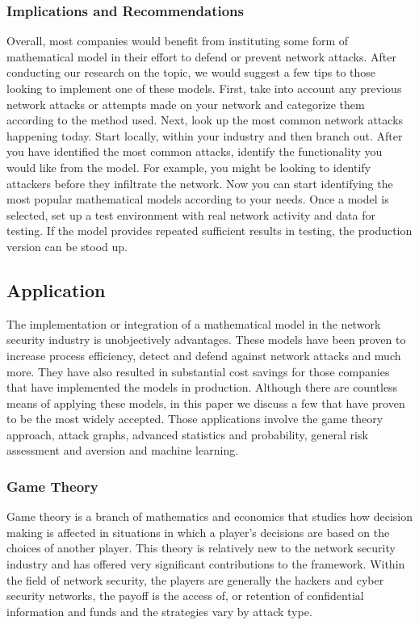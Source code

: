 \documentclass{article}
\begin{document}
\subsubsection{Implications and Recommendations}
Overall, most companies would benefit from instituting some form of mathematical model in their effort to defend or prevent network attacks. After conducting our research on the topic, we would suggest a few tips to those looking to implement one of these models. First, take into account any previous network attacks or attempts made on your network and categorize them according to the method used. Next, look up the most common network attacks happening today. Start locally, within your industry and then branch out. After you have identified the most common attacks, identify the functionality you would like from the model. For example, you might be looking to identify attackers before they infiltrate the network. Now you can start identifying the most popular mathematical models according to your needs. Once a model is selected, set up a test environment with real network activity and data for testing. If the model provides repeated sufficient results in testing, the production version can be stood up. 

\subsection{Application}
The implementation or integration of a mathematical model in the network security industry is unobjectively advantages. These models have been proven to increase process efficiency, detect and defend against network attacks and much more. They have also resulted in substantial cost savings for those companies that have implemented the models in production. Although there are countless means of applying these models, in this paper we discuss a few that have proven to be the most widely accepted. Those applications involve the game theory approach, attack graphs, advanced statistics and probability, general risk assessment and aversion and machine learning. 

\subsubsection{Game Theory}
Game theory is a branch of mathematics and economics that studies how decision making is affected in situations in which a player’s decisions are based on the choices of another player. This theory is relatively new to the network security industry and has offered very significant contributions to the framework. Within the field of network security, the players are generally the hackers and cyber security networks, the payoff is the access of, or retention of confidential information and funds and the strategies vary by attack type. 
\end{document}
